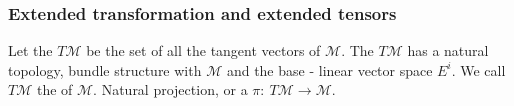 

\subsubsection{Extended transformation and extended tensors}

Let the $T\mathcal{M}$ be the set of all the tangent vectors of $\mathcal{M}$. 
The $T\mathcal{M}$ has a natural topology, bundle structure with $\mathcal{M}$ and the base - linear vector space $E^i$. 
We call $T\mathcal{M}$ the  of $\mathcal{M}$. 
Natural projection, or a  $\pi:\: T\mathcal{M}\rightarrow\mathcal{M}$.  

